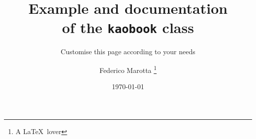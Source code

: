 \documentclass[
	fontsize=10pt, %
	twoside=false, %
	numbers=noenddot, %
]{kaobook}
\begin{document}

\titlehead{The \texttt{kaobook} class}
\subject{Use this document as a template}

\title[Example and documentation of the {\normalfont\texttt{kaobook}} class]{Example and documentation \\ of the {\normalfont\texttt{kaobook}} class}
\subtitle{Customise this page according to your needs}

\author[Federico Marotta]{Federico Marotta \thanks{A \LaTeX\ lover}}

\date{\today}

\publishers{An Awesome Publisher}


\frontmatter %




\makeatletter
\uppertitleback{\@titlehead} %
\end{document}
